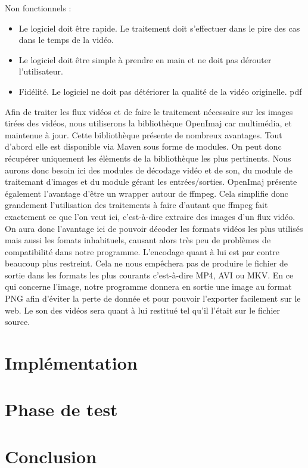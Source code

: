 \documentclass[10pt,a4paper]{article}
\begin{document}
Non fonctionnels :\newline
\begin{itemize}
\item Le logiciel doit être rapide. Le traitement doit s'effectuer dans le pire des cas dans le temps de la vidéo.
\item Le logiciel doit être simple à prendre en main et ne doit pas dérouter l'utilisateur.
\item Fidélité. Le logiciel ne doit pas détériorer la qualité de la vidéo originelle.
pdf\newline
\end{itemize}

Afin de traiter les flux vidéos et de faire le traitement nécessaire sur les images tirées des vidéos,
nous utiliserons la bibliothèque OpenImaj car multimédia, et maintenue à jour.
Cette bibliothèque présente de nombreux avantages. Tout d'abord elle est
disponible via Maven sous forme de modules. On peut donc récupérer uniquement les élèments de la bibliothèque
les plus pertinents. Nous aurons donc besoin ici des modules de décodage vidéo et de son, du module de traitemant d'images
et du module gérant les entrées/sorties. OpenImaj présente également l'avantage d'être un wrapper autour de ffmpeg.
Cela simplifie donc grandement l'utilisation des traitements à faire d'autant que ffmpeg fait exactement ce que l'on veut ici,
c'est-à-dire extraire des images d'un flux vidéo. On aura donc l'avantage ici de pouvoir décoder les formats vidéos
les plus utilisés mais aussi les fomats inhabituels, causant alors très peu de problèmes de compatibilité dans notre
programme. L'encodage quant à lui est par contre beaucoup plus restreint. Cela ne nous empêchera pas de produire
le fichier de sortie dans les formats les plus courants c'est-à-dire MP4, AVI ou MKV.
En ce qui concerne l'image, notre programme donnera en sortie une image au format PNG afin d'éviter la perte de donnée et
pour pouvoir l'exporter facilement sur le web.
Le son des vidéos sera quant à lui restitué tel qu'il l'était sur le fichier source.


\section{Implémentation}
\section{Phase de test}

\section{Conclusion}
\end{document}
